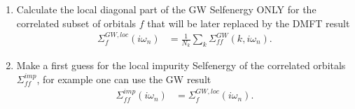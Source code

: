 \documentclass[12pt,a4paper]{scrartcl}
\numberwithin{equation}{section}
\newcommand{\GF}{Green's function}
\newcommand{\unity}{\mathds{1}}
\begin{document}
\begin{enumerate}


\item Calculate the local diagonal part of the GW Selfenergy ONLY for the correlated subset of orbitals $f$ that will be later replaced by the DMFT result
\begin{align}
 \Sigma^{GW,loc}_{f}(i\omega_n)
 &= \frac{1}{N_k}\sum_k \Sigma^{GW}_{ff}(k,i\omega_n).
\end{align}


% 

\item Make a first guess for the local impurity Selfenergy of the correlated
orbitals $\Sigma^{imp}_{ff}$, for example one can use the GW result
\begin{align}
 \Sigma^{imp}_{ff}(i\omega_n)
 &=  \Sigma^{GW,loc}_{f}(i\omega_n).
\end{align}


\end{enumerate}
\end{document}
